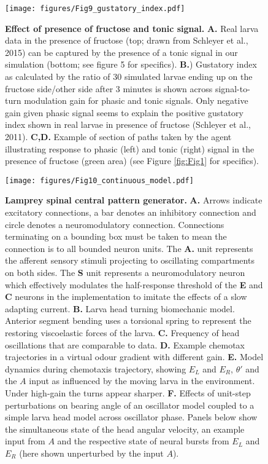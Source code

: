 \documentclass[10pt,a4paper]{article}
\begin{document}
\begin{figure}[!ht]
\begin{center}
\texttt{[image: figures/Fig9\_gustatory\_index.pdf]}
\caption{{\bf Effect of presence of fructose and tonic signal.}
{\bf A.} Real larva data in the presence of fructose (top; drawn from Schleyer et al., 2015) can be captured by the presence of a tonic signal in our simulation (bottom; see figure 5 for specifics).
{\bf B.}) Gustatory index as calculated by the ratio of 30 simulated larvae ending up on the fructose side/other side after 3 minutes is shown across signal-to-turn modulation gain for phasic and tonic signals. Only negative gain given phasic signal seems to explain the positive gustatory index shown in real larvae in presence of fructose (Schleyer et al., 2011).
{\bf C,D.} Example of section of paths taken by the agent illustrating response to phasic (left) and tonic (right) signal in the presence of fructose (green area) (see Figure \ref{fig:Fig1} for specifics).
\label{fig:Fig9}}
\end{center}
\end{figure}

\begin{figure}[!ht]
\begin{center}
\texttt{[image: figures/Fig10\_continuous\_model.pdf]}
\caption{{\bf Lamprey spinal central pattern generator.} {\bf A.} Arrows indicate excitatory connections, a bar denotes an inhibitory connection and circle denotes a neuromodulatory connection. Connections terminating on a bounding box must be taken to mean the connection is to all bounded neuron units. The {\bf A.} unit represents the afferent sensory stimuli projecting to oscillating compartments on both sides. The {\bf S} unit represents a neuromodulatory neuron which effectively modulates the half-response threshold of the {\bf E} and {\bf C} neurons in the \cite{wilson1999spikes} implementation to imitate the effects of a slow adapting current.
{\bf B.} Larva head turning biomechanic model. Anterior segment bending uses a torsional spring to represent the restoring viscoelastic forces of the larva.
{\bf C.} Frequency of head oscillations that are comparable to data.
{\bf D.} Example chemotax trajectories in a virtual odour gradient with different gain.
{\bf E.} Model dynamics during chemotaxis trajectory, showing $E_L$ and  $E_R$, $\theta'$ and the $A$ input as influenced by the moving larva in the environment. Under high-gain the turns appear sharper.
{\bf F.} Effects of unit-step perturbations on bearing angle of an oscillator model coupled to a simple larva head model across oscillator phase. Panels below show the simultaneous state of the head angular velocity, an example input from $A$ and the respective state of neural bursts from $E_L$ and $E_R$ (here shown unperturbed by the input $A$).
\label{fig:LampreyModel}}
\end{center}
\end{figure}
\end{document}
